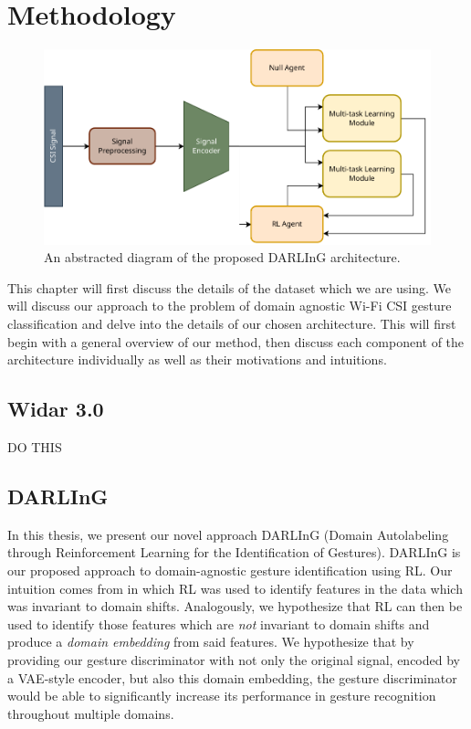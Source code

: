 \chapter{Methodology}\label{chapter:methodology}

\begin{figure}
	\centering
	\includegraphics[width=\linewidth]{figures/arch_diagram.pdf}
	\caption{An abstracted diagram of the proposed DARLInG architecture.}
	\label{fig:arch-diagram}
\end{figure}

This chapter will first discuss the details of the dataset which we are using. 
We will discuss our approach to the problem of domain agnostic Wi-Fi CSI gesture classification and delve into the details of our chosen architecture.
This will first begin with a general overview of our method, then discuss each component of the architecture individually as well as their motivations and intuitions.

\section{Widar 3.0}
DO THIS

\section{DARLInG}

In this thesis, we present our novel approach DARLInG (Domain Autolabeling through Reinforcement Learning for the Identification of Gestures).
DARLInG is our proposed approach to domain-agnostic gesture identification using RL.
Our intuition comes from \cite{zhang2021adversarial} in which RL was used to identify features in the data which was invariant to domain shifts.
Analogously, we hypothesize that RL can then be used to identify those features which are \textit{not} invariant to domain shifts and produce a \textit{domain embedding} from said features.
We hypothesize that by providing our gesture discriminator with not only the original signal, encoded by a VAE-style encoder, but also this domain embedding, the gesture discriminator would be able to significantly increase its performance in gesture recognition throughout multiple domains.

